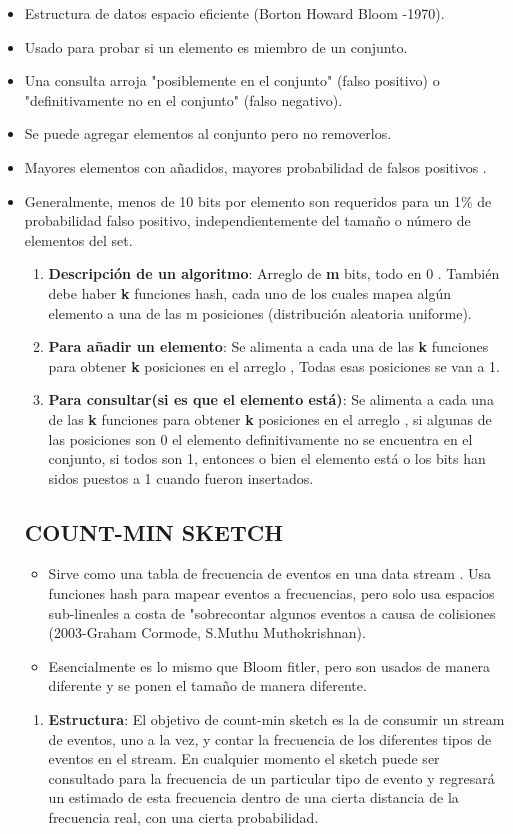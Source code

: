 \documentclass[journal]{IEEEtran}
\begin{document}
\begin{itemize}
    \item Estructura de datos espacio eficiente (Borton Howard Bloom -1970).
    \item Usado para probar si un elemento es miembro de un conjunto.
    \item Una consulta arroja "posiblemente en el conjunto" (falso positivo)  o "definitivamente no en el conjunto" (falso negativo).
    \item Se puede agregar elementos al conjunto pero no removerlos.
    \item Mayores elementos con añadidos, mayores probabilidad de falsos positivos .
    \item Generalmente, menos de 10 bits por elemento son requeridos para un 1\% de probabilidad falso positivo, independientemente del tamaño o número de elementos del set.\\
    \begin{enumerate}
    \item {\bf Descripción de un algoritmo}: Arreglo de \textbf{m} bits, todo en 0 . También debe haber \textbf{k} funciones hash, cada uno de los cuales mapea algún elemento a una de las m posiciones (distribución aleatoria uniforme). 
    \item {\bf Para añadir un elemento}: Se alimenta a cada una de las \textbf{k} funciones para obtener \textbf{k} posiciones en el arreglo , Todas esas posiciones se van a 1.
    \item {\bf Para consultar(si es que el elemento está)}: Se alimenta a cada una de las \textbf{k} funciones para obtener \textbf{k} posiciones en el arreglo , si algunas de las posiciones son 0 el elemento definitivamente no se encuentra en el conjunto, si todos son 1, entonces o bien el elemento está o los bits han sidos puestos a 1 cuando fueron insertados.
\end{enumerate}
\subsection{COUNT-MIN SKETCH}
\begin{itemize}
    \item Sirve como una tabla de frecuencia de eventos en una data stream . Usa funciones hash para mapear eventos a frecuencias, pero solo usa espacios sub-lineales a costa de "sobrecontar algunos eventos a causa de colisiones (2003-Graham Cormode, S.Muthu Muthokrishnan).
    \item Esencialmente es lo mismo que Bloom fitler, pero son usados de manera diferente y se ponen el tamaño de manera diferente.
\end{itemize}
\begin{enumerate}
    \item {\bf Estructura}: El objetivo de count-min sketch es la de consumir un stream de eventos, uno a la vez, y contar la frecuencia de los diferentes tipos de eventos en el stream. En cualquier momento el sketch puede ser consultado para la frecuencia de un particular tipo de evento y regresará un estimado de esta frecuencia dentro de una cierta distancia de la frecuencia real, con una cierta probabilidad.
\end{enumerate}

\end{itemize}
\end{document}

